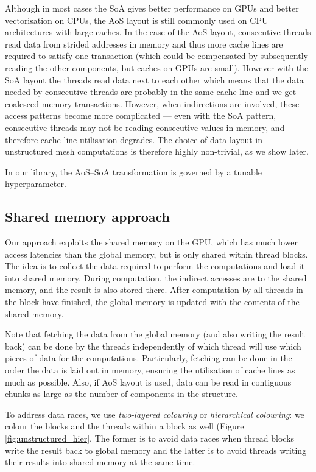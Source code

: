 Although in most cases the SoA gives better performance on GPUs and better
vectorisation on CPUs, the AoS layout is still commonly used on CPU
architectures with large caches. In the case of the AoS layout, consecutive
threads read data from strided addresses in memory and thus more cache lines are
required to satisfy one transaction (which could be compensated by subsequently
reading the other components, but caches on GPUs are small). However with the
SoA layout the threads read data next to each other which means that the data
needed by consecutive threads are probably in the same cache line and we get
coalesced memory transactions. However, when indirections are involved, these
access patterns become more complicated --- even with the SoA pattern,
consecutive threads may not be reading consecutive values in memory, and
therefore cache line utilisation degrades. The choice of data layout in
unstructured mesh computations is therefore highly non-trivial, as we show
later.

In our library, the AoS--SoA transformation is governed by a tunable
hyperparameter.

\subsection{Shared memory approach}\label{shared-memory-approach}

Our approach exploits the shared memory on the GPU, which has much lower access
latencies than the global memory, but is only shared within thread blocks. The
idea is to collect the data required to perform the computations and load it
into shared memory. During computation, the indirect accesses are to the shared
memory, and the result is also stored there. After computation by all threads
in the block have finished, the global memory is updated with the contents of
the shared memory.

Note that fetching the data from the global memory (and also writing the result
back) can be done by the threads independently of which thread will use which
pieces of data for the computations. Particularly, fetching can be done in the
order the data is laid out in memory, ensuring the utilisation of cache lines as
much as possible. Also, if AoS layout is used, data can be read in contiguous
chunks as large as the number of components in the structure.

To address data races, we use \emph{two-layered colouring} or \emph{hierarchical
colouring}\cite{op2}: we colour the blocks and the threads within a block as
well (Figure \ref{fig:unstructured_hier}. The former is to avoid data
races when thread blocks write the result back to global memory and the latter
is to avoid threads writing their results into shared memory at the same time.

